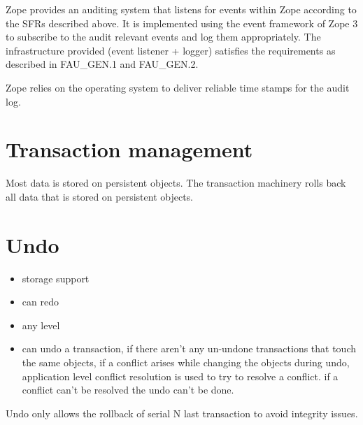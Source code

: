 \documentclass[10pt,a4paper,english]{scrbook}
\begin{document}
Zope provides an auditing system that listens for events within Zope according
to the SFRs described above. It is implemented using the event framework of
Zope 3 to subscribe to the audit relevant events and log them appropriately.
The infrastructure provided (event listener + logger) satisfies the
requirements as described in FAU{\_}GEN.1 and FAU{\_}GEN.2.

Zope relies on the operating system to deliver reliable time stamps for the
audit log.



\hypertarget{transaction-management}{}
\section{Transaction management}

Most data is stored on persistent objects. The transaction machinery rolls back
all data that is stored on persistent objects.



\hypertarget{undo}{}
\section{Undo}
\begin{itemize}
\item {} 
storage support

\item {} 
can redo

\item {} 
any level

\item {} 
can undo a transaction, if there aren't any un-undone transactions that touch
the same objects, if a conflict arises while changing the objects during
undo, application level conflict resolution is used to try to resolve a
conflict. if a conflict can't be resolved the undo can't be done.

\end{itemize}

Undo only allows the rollback of serial N last transaction to avoid integrity issues.



\hypertarget{publication-server}{}
\end{document}
